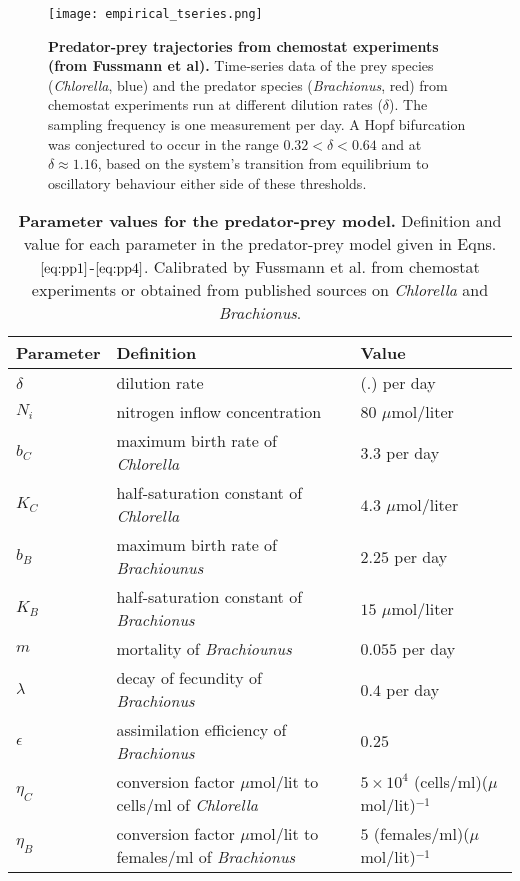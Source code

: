 \documentclass[10pt]{article}
\begin{document}
\begin{figure}[H]
\centering
\texttt{[image: empirical\_tseries.png]}
\vspace{0.4cm}
\caption{\textbf{Predator-prey trajectories from chemostat experiments (from Fussmann et al\cite{fussmann00}).} Time-series data of the prey species (\textit{Chlorella}, blue) and the predator species (\textit{Brachionus}, red) from chemostat experiments run at different dilution rates ($\delta$). The sampling frequency is one measurement per day. A Hopf bifurcation was conjectured to occur in the range $0.32<\delta<0.64$ and at $\delta\approx 1.16$, based on the system's transition from equilibrium to oscillatory behaviour either side of these thresholds.}
\label{fig:fussmann_tseries}
\end{figure}


\begin{table}[ht]
\centering
\tabulinesep=0.4mm
\begin{tabu}{l l l}
\hline
Parameter & Definition & Value \\ \hline
%
$\delta$ & dilution rate & (.) per day\\
$N_i$ & nitrogen inflow concentration & $80$ $\mu$mol/liter\\
$b_C$ & maximum birth rate of \textit{Chlorella} & $3.3$ per day \\
$K_C$ & half-saturation constant of \textit{Chlorella} & $4.3$ $\mu$mol/liter \\
$b_B$ & maximum birth rate of \textit{Brachiounus}  & $2.25$ per day \\
$K_B$ & half-saturation constant of \textit{Brachionus} & $15$ $\mu$mol/liter \\
$m$ & mortality of \textit{Brachiounus} & $0.055$ per day \\
$\lambda$ & decay of fecundity of \textit{Brachionus} & $0.4$ per day \\
$\epsilon$ & assimilation efficiency of \textit{Brachionus} & $0.25$ \\
$\eta_C$ & conversion factor $\mu$mol/lit to cells/ml of \textit{Chlorella} & $5\times 10^4$ (cells/ml)($\mu$mol/lit)$^{-1}$ \\
$\eta_B$ & conversion factor $\mu$mol/lit to females/ml of \textit{Brachionus} & $5$ (females/ml)($\mu$mol/lit)$^{-1}$\\
\end{tabu}
\vspace{0.4cm}
\caption{\textbf{Parameter values for the predator-prey model.} Definition and value for each parameter in the predator-prey model given in Eqns. $\eqref{eq:pp1}$-$\eqref{eq:pp4}$. Calibrated by Fussmann et al.\cite{fussmann00} from chemostat experiments or obtained from published sources on \textit{Chlorella} and \textit{Brachionus}.}
\label{tab:fussmann_pars}
\end{table}
\end{document}
